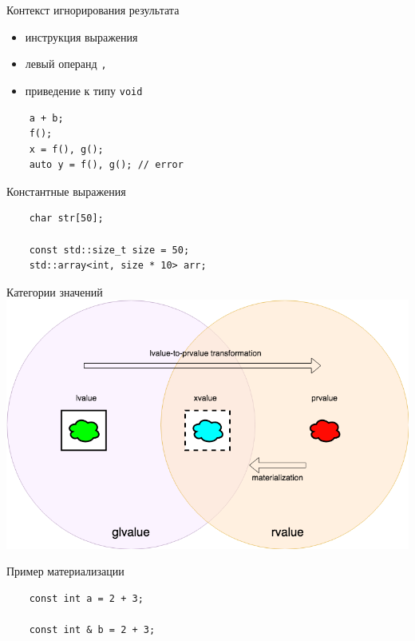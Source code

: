 \documentclass[unknownkeysallowed,xcolor=table]{beamer}
\begin{document}
\begin{frame}[fragile]{Контекст игнорирования результата}
  \begin{itemize}
    \item инструкция выражения \vspace{1em}
    \item левый операнд \lstinline{,} \vspace{1em}
    \item приведение к типу \lstinline{void}
  \end{itemize}
  \begin{lstlisting}
    a + b;
    f();
    x = f(), g();
    auto y = f(), g(); // error
  \end{lstlisting}
\end{frame}

\begin{frame}[fragile]{Константные выражения}
  \begin{lstlisting}
    char str[50];

    const std::size_t size = 50;
    std::array<int, size * 10> arr;
  \end{lstlisting}
\end{frame}

\begin{frame}{Категории значений}
  \includegraphics[width = \textwidth,align=c,keepaspectratio]{images/value_categories.png}
\end{frame}

\begin{frame}[fragile]{Пример материализации}
  \begin{lstlisting}
    const int a = 2 + 3;

    const int & b = 2 + 3;
  \end{lstlisting}
\end{frame}
\end{document}
